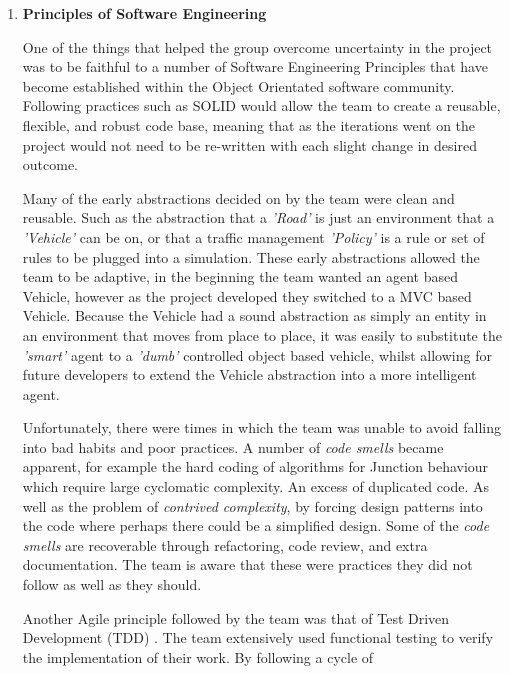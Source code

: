 \documentclass[11pt]{article}
\begin{document}
{\begin{enumerate}
	This wasn't a case of hacking a project together \textit{ad-hoc}. But a case of the team recognizing being in the situation of attempting a project with uncertain or undefined specification, and researching an established methodology for tackling these kinds of project. Then being pragmatic about adapting the methods to suit our needs.
	
	\item \textbf{Principles of Software Engineering}
	
	One of the things that helped the group overcome uncertainty in the project was to be faithful to a number of Software Engineering Principles that have become established within the Object Orientated software community. Following practices such as SOLID \cite{website:Principles-of-OOD} would allow the team to create a reusable, flexible, and robust code base, meaning that as the iterations went on the project would not need to be re-written with each slight change in desired outcome.
	
	Many of the early abstractions decided on by the team were clean and reusable. Such as the abstraction that a \textit{'Road'} is just an environment that a \textit{'Vehicle'} can be on, or that a traffic management \textit{'Policy'} is a rule or set of rules to be plugged into a simulation. These early abstractions allowed the team to be adaptive, in the beginning the team wanted an agent based Vehicle, however as the project developed they switched to a MVC based Vehicle. Because the Vehicle had a sound abstraction as simply an entity in an environment that moves from place to place, it was easily to substitute the \textit{'smart'} agent to a \textit{'dumb'} controlled object based vehicle, whilst allowing for future developers to extend the Vehicle abstraction into a more intelligent agent.
	
	Unfortunately, there were times in which the team was unable to avoid falling into bad habits and poor practices. A number of \textit{code smells} became apparent, for example the hard coding of algorithms for Junction behaviour which require large cyclomatic complexity. An excess of duplicated code. As well as the problem of \textit{contrived complexity}, by forcing design patterns into the code where perhaps there could be a simplified design. Some of the \textit{code smells} are recoverable through refactoring, code review, and extra documentation. The team is aware that these were practices they did not follow as well as they should.
	
	Another Agile principle followed by the team was that of Test Driven Development (TDD) \cite{website:Intro-TDD}. The team extensively used functional testing to verify the implementation of their work. By following a cycle of 
	

\end{enumerate}}
\end{document}
